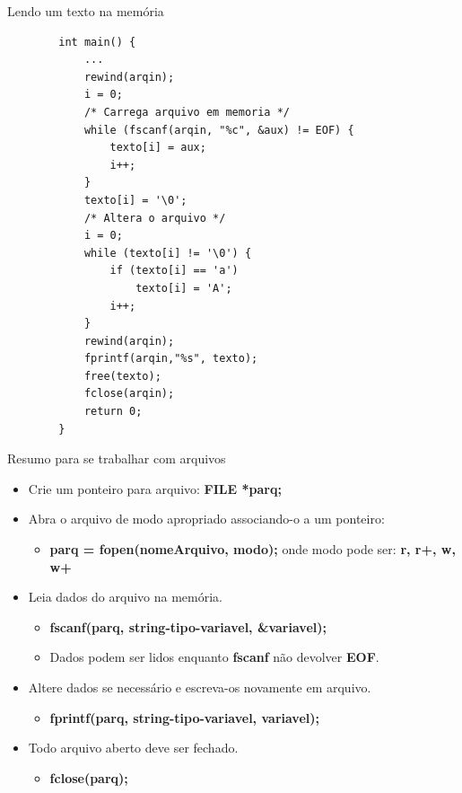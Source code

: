 \documentclass[handout]{beamer}
\begin{document}
\begin{frame}[fragile]{Lendo um texto na memória}
    \vspace{-1.5em}
    \begin{verbatim}
        int main() {
            ...
            rewind(arqin);
            i = 0;
            /* Carrega arquivo em memoria */
            while (fscanf(arqin, "%c", &aux) != EOF) {
                texto[i] = aux;
                i++;
            }
            texto[i] = '\0';
            /* Altera o arquivo */
            i = 0;
            while (texto[i] != '\0') {
                if (texto[i] == 'a')
                    texto[i] = 'A';
                i++;
            }
            rewind(arqin);
            fprintf(arqin,"%s", texto);
            free(texto);
            fclose(arqin);
            return 0;
        }
    \end{verbatim}
\end{frame}

\begin{frame}[fragile]{Resumo para se trabalhar com arquivos}
    \begin{itemize}
        \item Crie um ponteiro para arquivo: \textbf{FILE *parq;}

        \item Abra o arquivo de modo apropriado associando-o a um ponteiro:
        \begin{itemize}
            \item \textbf{parq = fopen(nomeArquivo, modo);} onde modo pode ser: \textbf{r, r+, w, w+}
        \end{itemize}

        \item Leia dados do arquivo na memória.
        \begin{itemize}
            \item \textbf{fscanf(parq, string-tipo-variavel, \&variavel);}
            \item Dados podem ser lidos enquanto \textbf{fscanf} não devolver \textbf{EOF}.
        \end{itemize}

        \item Altere dados se necessário e escreva-os novamente em arquivo.
        \begin{itemize}
            \item \textbf{fprintf(parq, string-tipo-variavel, variavel);}
        \end{itemize}

        \item Todo arquivo aberto deve ser fechado.
        \begin{itemize}
            \item \textbf{fclose(parq); }
        \end{itemize}

    \end{itemize}
\end{frame}
\end{document}

